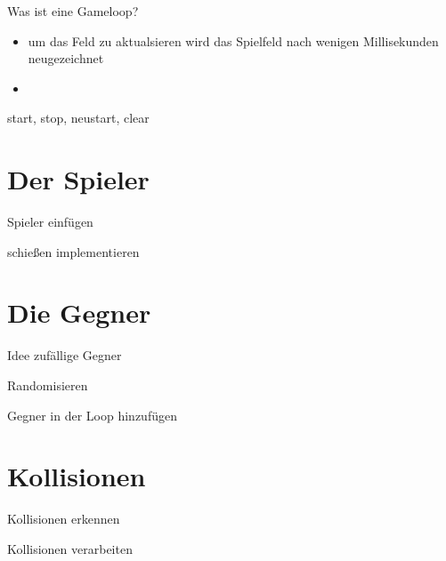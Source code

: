\documentclass[18pt]{beamer}
\begin{document}
\begin{frame}{Was ist eine Gameloop?}
\begin{itemize}
	\item um das Feld zu aktualsieren wird das Spielfeld nach wenigen Millisekunden neugezeichnet
	\item 
\end{itemize}
\end{frame}

\begin{frame}{start, stop, neustart, clear}
\end{frame}

\section{Der Spieler}

\begin{frame}{Spieler einfügen}
\end{frame}

\begin{frame}{schießen implementieren}
\end{frame}

\section{Die Gegner}
\begin{frame}{Idee zufällige Gegner}
\end{frame}

\begin{frame}{Randomisieren}
\end{frame}

\begin{frame}{Gegner in der Loop hinzufügen}
\end{frame}

\section{Kollisionen}
\begin{frame}{Kollisionen erkennen}
\end{frame}

\begin{frame}{Kollisionen verarbeiten}
\end{frame}
\end{document}
